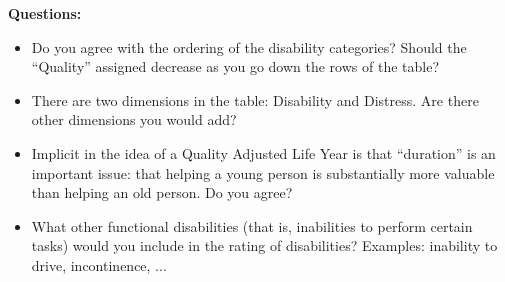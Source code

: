 \bigskip

{\bf Questions:}
\begin{itemize}
\item Do you agree with the ordering of the disability categories?  Should the ``Quality'' assigned decrease as you go down the rows of the table?

\item There are two dimensions in the table: Disability and Distress.  Are there other dimensions you would add?  

\item Implicit in the idea of a Quality Adjusted Life Year is that ``duration'' is an important issue: that helping a young person is substantially more valuable than helping an old person.  Do you agree?

\item What other functional disabilities (that is, inabilities to perform certain tasks) would you include in the rating of disabilities?  Examples: inability to drive, incontinence, ...

\end{itemize}


